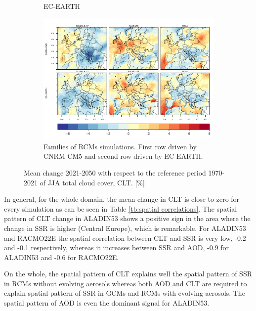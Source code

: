 \begin{figure}[h]
\begin{subfigure}{0.4\textwidth}
    \caption{EC-EARTH}
  \end{subfigure}
  \hspace{0.1mm}
  \centering\begin{subfigure}{1\textwidth}  
    \includegraphics[width=1\textwidth]{figs/capitulo7/ANOMALIAS_JJA_CLT_2050-2021_r12_names.pdf}
\caption{Families of RCMs simulations. First row driven by CNRM-CM5 and second row driven by EC-EARTH.}
\end{subfigure}
\caption[Change in summer CLT over Europe for the period 2021-2050 with respect of 1971-2000 with different climate models]{Mean change 2021-2050 with respect to the reference period 1970-2021 of JJA total cloud cover, CLT. [\%]}
\label{fig:anomalyCLT}      
\end{figure}

In general, for the whole domain, the mean change in CLT is close to zero for every simulation as can be seen in Table \ref{tb:spatial correlations}. The spatial pattern of CLT change in ALADIN53 shows a positive sign in the area where the change in SSR is higher (Central Europe), which is remarkable. For ALADIN53 and RACMO22E the spatial correlation between CLT and SSR is very low, -0.2 and -0.1 respectively, whereas it increases between SSR and AOD, -0.9 for ALADIN53 and -0.6 for RACMO22E.

On the whole, the spatial pattern of CLT explains well the spatial pattern of SSR in RCMs without evolving aerosols whereas both AOD and CLT are required to explain spatial pattern of SSR in GCMs and RCMs with evolving aerosols. The spatial pattern of AOD is even the dominant signal for ALADIN53.


